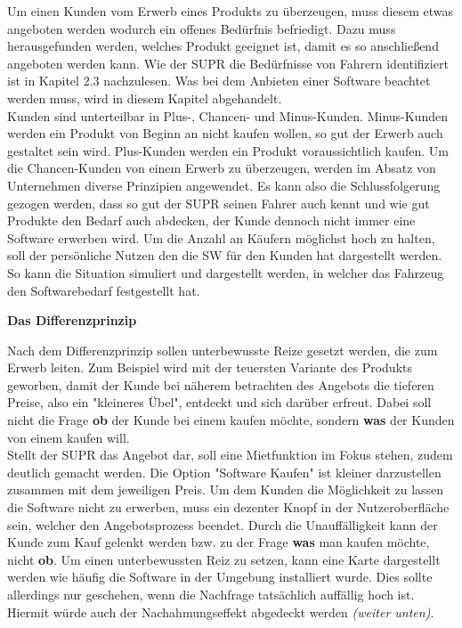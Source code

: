 Um einen Kunden vom Erwerb eines Produkts zu überzeugen, muss diesem etwas angeboten werden wodurch ein offenes Bedürfnis befriedigt. Dazu muss herausgefunden werden, welches Produkt geeignet ist, damit es so anschließend angeboten werden kann. Wie der SUPR die Bedürfnisse von Fahrern identifiziert ist in Kapitel 2.3 nachzulesen. Was bei dem Anbieten einer Software beachtet werden muss, wird in diesem Kapitel abgehandelt.\\
Kunden sind unterteilbar in Plus-, Chancen- und Minus-Kunden.\cite[S. 10ff.]{vkPsy} Minus-Kunden werden ein Produkt von Beginn an nicht kaufen wollen, so gut der Erwerb auch gestaltet sein wird. Plus-Kunden werden ein Produkt voraussichtlich kaufen. Um die Chancen-Kunden von einem Erwerb zu überzeugen, werden im Absatz von Unternehmen diverse Prinzipien angewendet. Es kann also die Schlussfolgerung gezogen werden, dass so gut der SUPR seinen Fahrer auch kennt und wie gut Produkte den Bedarf auch abdecken, der Kunde dennoch nicht immer eine Software erwerben wird. Um die Anzahl an Käufern möglichst hoch zu halten, soll der persönliche Nutzen den die SW für den Kunden hat dargestellt werden. So kann die Situation simuliert und dargestellt werden, in welcher das Fahrzeug den Softwarebedarf festgestellt hat.\\

\begin{large}
	\textbf{Das Differenzprinzip}\cite[S. 19fff.]{vkPsy}\\
\end{large}
Nach dem Differenzprinzip sollen unterbewusste Reize gesetzt werden, die zum Erwerb leiten. Zum Beispiel wird mit der teuersten Variante des Produkts geworben, damit der Kunde bei näherem betrachten des Angebots die tieferen Preise, also ein "kleineres Übel", entdeckt und sich darüber erfreut. Dabei soll nicht die Frage \textbf{ob} der Kunde bei einem kaufen möchte, sondern \textbf{was} der Kunden von einem kaufen will.\\
Stellt der SUPR das Angebot dar, soll eine Mietfunktion im Fokus stehen, zudem deutlich gemacht werden. Die Option "Software Kaufen" ist kleiner darzustellen zusammen mit dem jeweiligen Preis. Um dem Kunden die Möglichkeit zu lassen die Software nicht zu erwerben, muss ein dezenter Knopf in der Nutzeroberfläche sein, welcher den Angebotsprozess beendet. Durch die Unauffälligkeit kann der Kunde zum Kauf gelenkt werden bzw. zu der Frage \textbf{was} man kaufen möchte, nicht \textbf{ob}. Um einen unterbewussten Reiz zu setzen, kann eine Karte dargestellt werden wie häufig die Software in der Umgebung installiert wurde. Dies sollte allerdings nur geschehen, wenn die Nachfrage tatsächlich auffällig hoch ist. Hiermit würde auch der Nachahmungseffekt abgedeckt werden\textit{ (weiter unten)}.\\

